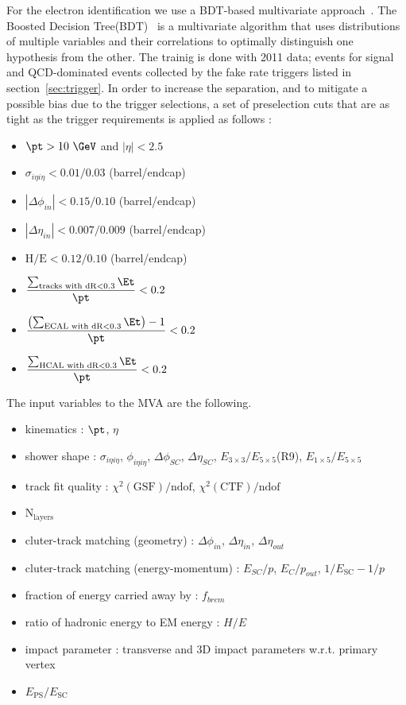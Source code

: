 For the electron identification we use a BDT-based multivariate 
approach~\cite{Chatrchyan:2012ufa}. The Boosted Decision Tree(BDT)~\cite{Hocker:2007ht} 
is a multivariate algorithm that uses distributions of multiple variables 
and their correlations to optimally distinguish one hypothesis from the other.  
The trainig is done with 2011 data; \dyll{} events for signal and QCD-dominated events 
collected by the fake rate triggers listed in section~\ref{sec:trigger}. 
In order to increase the separation, and to mitigate a possible bias 
due to the trigger selections, a set of preselection cuts that are as tight as the trigger 
requirements is applied as follows :  
\begin{itemize}
  \item $\pt>10~\GeV$ and $|\eta| < 2.5$
  \item $\sigma_{i\eta i\eta} < 0.01/0.03$ (barrel/endcap)
  \item $|\Delta\phi_{in}| < 0.15/0.10$ (barrel/endcap)
  \item $|\Delta\eta_{in}| < 0.007/0.009$ (barrel/endcap)
  \item $\textrm{H/E}< 0.12/0.10$ (barrel/endcap)
  \item $\displaystyle \frac{\sum_{\textrm{tracks with dR}<0.3}\Et}{\pt}<0.2$
  \item $\displaystyle \frac{\left(\sum_{\textrm{ECAL with dR}<0.3}\Et\right)-1}{\pt}<0.2$
  \item $\displaystyle \frac{\sum_{\textrm{HCAL with dR}<0.3}\Et}{\pt}<0.2$
\end{itemize}
The input variables to the MVA are the following.
\begin{itemize}
\item kinematics : $\pt$,  $\eta$
\item shower shape : $\sigma_{i\eta i\eta}$, $\phi_{i\eta i\eta}$, $\Delta \phi_{SC}$, $\Delta \eta_{SC}$, $E_{3\times3}/E_{5\times5}$(R9), $E_{1\times5}/E_{5\times5}$
\item track fit quality : $\chi^2(\textrm{GSF})/\textrm{ndof} $, $\chi^2(\textrm{CTF})/\textrm{ndof}$ 
\item $\textrm{N}_\textrm{layers}$  
\item cluter-track matching (geometry) : $\Delta \phi_{in}$, $\Delta \eta_{in}$, $\Delta \eta_{out}$
\item cluter-track matching (energy-momentum) : $E_{SC}/p$, $E_{C}/p_{out}$, $1/E_\textrm{SC} - 1/p$ 
\item fraction of energy carried away by \brem{} : $f_{brem}$ 
\item ratio of hadronic energy to EM energy  : $H/E$ 
\item impact parameter :  transverse and 3D impact parameters w.r.t. primary vertex
\item $E_{\textrm{PS}}/E_{\textrm{SC}}$
\end{itemize}
